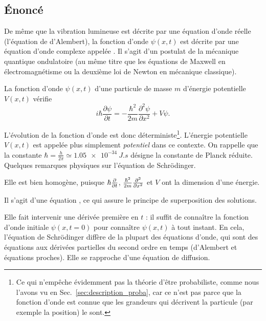 \documentclass[12pt,fancy]{cours}
\begin{document}
\subsection{Énoncé}
\label{subsec:schrodinger}
De même que la vibration lumineuse est décrite par une équation d’onde réelle (l’équation de d’Alembert), la fonction d’onde $\psi(x,t)$ est décrite par une équation d'onde complexe appelée . Il s'agit d'un postulat de la mécanique quantique ondulatoire (au même titre que les équations de Maxwell en électromagnétisme ou la deuxième loi de Newton en mécanique classique).
\begin{theorem}\label{form:}
La fonction d'onde $\psi(x,t)$ d'une particule de masse $m$ d'énergie potentielle $V(x,t)$  vérifie
\begin{equation*}
  i\hbar\frac{\partial\psi}{\partial t}=-\frac{\hbar^2}{2m}\frac{\partial^2\psi}{\partial x^2}+V\psi.
\end{equation*}
\end{theorem}
  L'évolution de la fonction d'onde est donc déterministe\footnote{Ce qui n'empêche évidemment pas la théorie d'être probabiliste, comme nous l'avons vu en Sec.~\ref{sec:description_proba}, car ce n'est pas parce que la fonction d'onde est connue que les grandeurs qui décrivent la particule (par exemple la position) le sont.}.
L’énergie potentielle $V(x,t)$ est appelée plus simplement \emph{potentiel} dans ce contexte.
On rappelle que la constante $\hbar=\frac{h}{2\pi}\simeq\SI{1,05e-34}{J.s}$ désigne la constante de Planck réduite.
Quelques remarques physiques sur l'équation de Schrödinger.
\begin{liste}
  \item Elle est bien homogène, puisque $\hbar \frac{\partial{}}{\partial{t}}$, $\frac{\hbar^2}{2m} \frac{\partial^2{}}{\partial{x}^2}$ et $V$ ont la dimension d’une énergie.
\item Il s'agit d'une équation , ce qui assure le principe de superposition des solutions.
\item Elle fait intervenir une dérivée première en $t$ : il suffit de connaître la fonction d'onde initiale $\psi(x,t=0)$ pour connaître  $\psi(x,t)$ à tout instant. En cela, l'équation de Schrödinger diffère de la plupart des équations d'onde, qui sont des équations aux dérivées partielles du second ordre en temps (d'Alembert et équations proches). Elle se rapproche d'une équation de diffusion. 
\end{liste}
\end{document}
